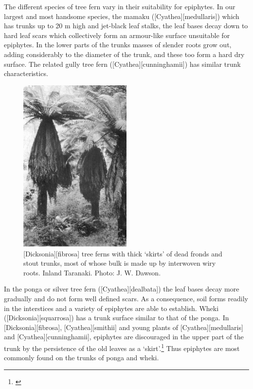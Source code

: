 The different species of tree fern vary in their suitability for epiphytes.
In our largest and most handsome species, the mamaku ([Cyathea][medullaris]) which has trunks up to 20 m high and jet-black leaf stalks, the leaf bases decay down to hard leaf scars which collectively form an armour-like surface unsuitable for epiphytes.
In the lower parts of the trunks masses of slender roots grow out, adding considerably to the diameter of the trunk, and these too form a hard dry surface.
The related gully tree fern ([Cyathea][cunninghamii]) has similar trunk characteristics.

\begin{figure}
	\includegraphics[width=0.5\textwidth]{graphics/figure54dicksonia-fibrosa.jpg}
	\centering
	\caption[\emph{Dicksonia fibrosa} tree ferns with thick `skirts' of dead fronds and stout trunks]{[Dicksonia][fibrosa] tree ferns with thick `skirts' of dead fronds and stout trunks, most of whose bulk is made up by interwoven wiry roots.
Inland Taranaki.
	Photo: J. W. Dawson.}%
	\label{fig:54dicksonia-fibrosa}
\end{figure}

In the ponga or silver tree fern ([Cyathea][dealbata]) the leaf bases decay more gradually and do not form well defined scars.
As a consequence, soil forms readily in the interstices and a variety of epiphytes are able to establish.
Wheki ([Dicksonia][squarrosa]) has a trunk surface similar to that of the ponga.
In [Dicksonia][fibrosa], [Cyathea][smithii] and young plants of [Cyathea][medullaris] and [Cyathea][cunninghamii],  epiphytes are discouraged in the upper part of the trunk by the persistence of the old leaves as a `skirt'.\footnote{\cite{page1986tree}}
Thus epiphytes are most commonly found on the trunks of ponga and wheki.

